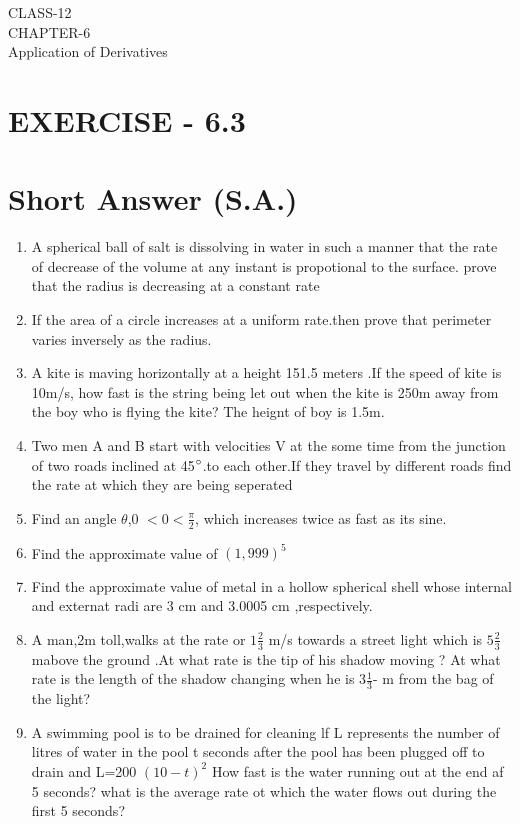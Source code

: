 \documentclass[12pt]{article}
\begin{document}
\begin{center}
\textbf\large{CLASS-12\\CHAPTER-6 \\ Application of Derivatives}
\end{center}

\section*{EXERCISE - 6.3}
\section*{Short Answer (S.A.)}
\begin{enumerate}
\item A spherical ball of salt is dissolving in water in such a manner that the rate of decrease of the volume at any instant is propotional to the surface. prove that the radius is decreasing at a constant rate
\item If the area of a circle increases at a uniform rate.then prove that perimeter varies inversely as the radius.
\item A kite is maving horizontally at a height 151.5 meters .If the speed of kite is 10m/s, how fast is the string being let out when the kite is 250m away from the boy who is flying the kite? The heignt of boy is 1.5m. 
 \item Two men A and B start with velocities V at  the some time from the junction of two roads inclined at 45$\degree$.to each other.If they travel by different roads find the rate at which they are being seperated
\item Find an angle $\theta$,0 $<$0$<$$\frac{\pi}{2}$, which increases twice as fast as its sine.
\item Find the approximate value of $(1,999)^5$
\item Find the approximate value of metal in a hollow spherical shell whose internal and externat radi are 3 cm and 3.0005 cm ,respectively.
\item A man,2m toll,walks at the rate or $1\frac{2}{3}$ m/s towards a street light which is $5\frac{2}{3}$ mabove the ground .At what rate is the tip of his shadow moving ? At what rate is the length of the shadow changing when he is $3\frac{1}{3}$- m from the bag of the light?
\item A swimming pool  is to be drained for cleaning lf L represents the number of litres of water in the pool t seconds after the pool has been plugged off to drain and L=200 $(10-t)^2$ How fast is  the water running out at the end af 5 seconds? what is the average rate ot which the water flows out during the first 5 seconds?
$$
\end{enumerate}
\end{document}
